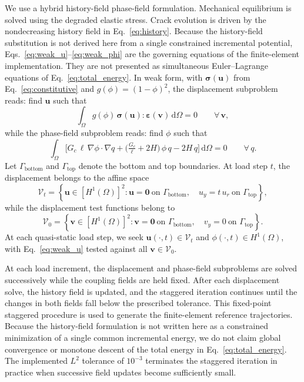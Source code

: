 \documentclass[10pt]{article}
\theoremstyle{definition}
\begin{document}
We use a hybrid history-field phase-field formulation.
%
Mechanical equilibrium is solved using the degraded elastic stress.
%
Crack evolution is driven by the nondecreasing history field in Eq.~\eqref{eq:history}.
%
Because the history-field substitution is not derived here from a single constrained incremental potential, Eqs.~\eqref{eq:weak_u}--\eqref{eq:weak_phi} are the governing equations of the finite-element implementation.
%
They are not presented as simultaneous Euler--Lagrange equations of Eq.~\eqref{eq:total_energy}.
%
In weak form, with $\boldsymbol{\sigma}(\mathbf{u})$ from Eq.~\eqref{eq:constitutive} and $g(\phi)=(1-\phi)^2$, the displacement subproblem reads: find $\mathbf{u}$ such that
%
\begin{equation}
    \int_{\Omega} g(\phi)\,\boldsymbol{\sigma}(\mathbf{u}):\boldsymbol{\varepsilon}(\mathbf{v})\,\mathrm{d}\Omega = 0
    \qquad \forall\,\mathbf{v},
    \label{eq:weak_u}
\end{equation}
%
while the phase-field subproblem reads: find $\phi$ such that
%
\begin{equation}
    \int_{\Omega} \Big[ G_c\,\ell\,\nabla\phi\!\cdot\!\nabla q
    + \big(\tfrac{G_c}{\ell} + 2H\big)\,\phi\,q
    - 2H\,q \Big]\,\mathrm{d}\Omega = 0
    \qquad \forall\,q .
    \label{eq:weak_phi}
\end{equation}
%
Let $\Gamma_{\mathrm{bottom}}$ and $\Gamma_{\mathrm{top}}$ denote the bottom
and top boundaries. At load step $t$, the displacement belongs to the affine
space
\[
\mathcal{V}_t
=
\left\{
\mathbf{u}\in[H^1(\Omega)]^2:
\mathbf{u}=\mathbf{0}
\ \text{on }\Gamma_{\mathrm{bottom}},
\quad
u_y=t\,u_r
\ \text{on }\Gamma_{\mathrm{top}}
\right\},
\]
while the displacement test functions belong to
\[
\mathcal{V}_0
=
\left\{
\mathbf{v}\in[H^1(\Omega)]^2:
\mathbf{v}=\mathbf{0}
\ \text{on }\Gamma_{\mathrm{bottom}},
\quad
v_y=0
\ \text{on }\Gamma_{\mathrm{top}}
\right\}.
\]
At each quasi-static load step, we seek
$\mathbf{u}(\cdot,t)\in\mathcal{V}_t$ and
$\phi(\cdot,t)\in H^1(\Omega)$, with Eq.~\eqref{eq:weak_u} tested against all
$\mathbf{v}\in\mathcal{V}_0$.

At each load increment, the displacement and phase-field subproblems are solved successively while the coupling fields are held fixed.
%
After each displacement solve, the history field is updated, and the staggered iteration continues until the changes in both fields fall below the prescribed tolerance.
%
This fixed-point staggered procedure is used to generate the finite-element reference trajectories.
%
Because the history-field formulation is not written here as a constrained minimization of a single common incremental energy, we do not claim global convergence or monotone descent of the total energy in Eq.~\eqref{eq:total_energy}.
%
The implemented $L^2$ tolerance of $10^{-3}$ terminates the staggered iteration in practice when successive field updates become sufficiently small.
\end{document}
